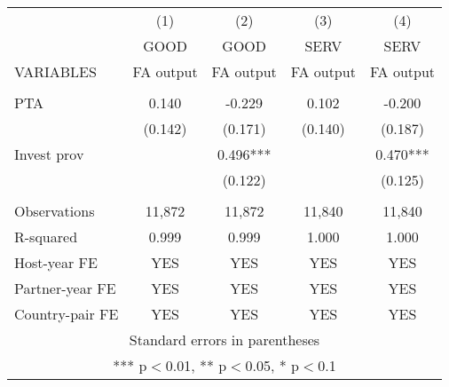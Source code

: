 \begin{tabular}{lcccc} \hline
 & (1) & (2) & (3) & (4) \\
 & GOOD & GOOD & SERV & SERV \\
VARIABLES & FA output & FA output & FA output & FA output \\ \hline
 &  &  &  &  \\
PTA & 0.140 & -0.229 & 0.102 & -0.200 \\
 & (0.142) & (0.171) & (0.140) & (0.187) \\
Invest prov &  & 0.496*** &  & 0.470*** \\
 &  & (0.122) &  & (0.125) \\
 &  &  &  &  \\
Observations & 11,872 & 11,872 & 11,840 & 11,840 \\
R-squared & 0.999 & 0.999 & 1.000 & 1.000 \\
Host-year FE & YES & YES & YES & YES \\
Partner-year FE & YES & YES & YES & YES \\
 Country-pair FE & YES & YES & YES & YES \\ \hline
\multicolumn{5}{c}{ Standard errors in parentheses} \\
\multicolumn{5}{c}{ *** p$<$0.01, ** p$<$0.05, * p$<$0.1} \\
\end{tabular}
